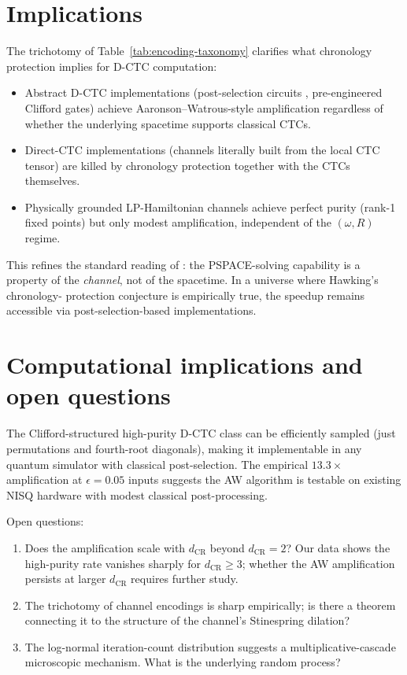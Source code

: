 \documentclass[11pt,a4paper]{article}
\begin{document}
\section{Implications}

The trichotomy of Table~\ref{tab:encoding-taxonomy} clarifies what
chronology protection implies for D-CTC computation:

\begin{itemize}
\item Abstract D-CTC implementations (post-selection circuits
\cite{Aaronson2005}, pre-engineered Clifford gates) achieve
Aaronson--Watrous-style amplification regardless of whether the
underlying spacetime supports classical CTCs.
\item Direct-CTC implementations (channels literally built from the
local CTC tensor) are killed by chronology protection together
with the CTCs themselves.
\item Physically grounded LP-Hamiltonian channels achieve perfect
purity (rank-1 fixed points) but only modest amplification,
independent of the $(\omega, R)$ regime.
\end{itemize}

This refines the standard reading of \cite{AaronsonWatrous2009}: the
PSPACE-solving capability is a property of the \emph{channel}, not
of the spacetime. In a universe where Hawking's chronology-
protection conjecture is empirically true, the speedup remains
accessible via post-selection-based implementations.

\section{Computational implications and open questions}

The Clifford-structured high-purity D-CTC class can be efficiently
sampled (just permutations and fourth-root diagonals), making it
implementable in any quantum simulator with classical post-selection.
The empirical $13.3\times$ amplification at $\epsilon = 0.05$ inputs
suggests the AW algorithm is testable on existing NISQ hardware with
modest classical post-processing.

Open questions:

\begin{enumerate}
\item Does the amplification scale with $d_{\text{CR}}$ beyond
$d_{\text{CR}} = 2$? Our data shows the high-purity rate vanishes
sharply for $d_{\text{CR}} \ge 3$; whether the AW amplification
persists at larger $d_{\text{CR}}$ requires further study.
\item The trichotomy of channel encodings is sharp empirically;
is there a theorem connecting it to the structure of the channel's
Stinespring dilation?
\item The log-normal iteration-count distribution suggests a
multiplicative-cascade microscopic mechanism. What is the
underlying random process?
\end{enumerate}
\end{document}
